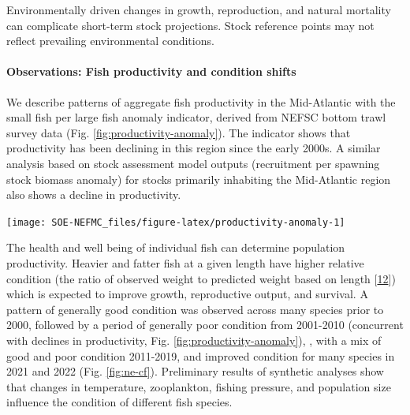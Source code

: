 \documentclass[
  10pt,
]{article}
\let\origfigure\figure
\let\endorigfigure\endfigure
\renewenvironment{figure}[1][2] {
    \expandafter\origfigure\expandafter[H]
} {
    \endorigfigure
}
\begin{document}
Environmentally driven changes in growth, reproduction, and natural mortality can complicate short-term stock projections. Stock reference points may not reflect prevailing environmental conditions.

\hypertarget{observations-fish-productivity-and-condition-shifts}{%
\paragraph{Observations: Fish productivity and condition shifts}\label{observations-fish-productivity-and-condition-shifts}}

We describe patterns of aggregate fish productivity in the Mid-Atlantic with the small fish per large fish anomaly indicator, derived from NEFSC bottom trawl survey data (Fig. \ref{fig:productivity-anomaly}). The indicator shows that productivity has been declining in this region since the early 2000s. A similar analysis based on stock assessment model outputs (recruitment per spawning stock biomass anomaly) for stocks primarily inhabiting the Mid-Atlantic region also shows a decline in productivity.

\begin{figure}

{\centering \texttt{[image: SOE-NEFMC\_files/figure-latex/productivity-anomaly-1]} 

}

\caption{Fish productivity measures. Left: Small fish per large fish survey biomass anomaly in the Mid-Atlantic Bight. Right: assessment recruitment per spawning stock biomass anomaly for stocks mainly in the Mid-Atlantic. The summed anomaly across species is shown by the black line, drawn across all years with the same number of stocks analyzed.}\label{fig:productivity-anomaly}
\end{figure}

The health and well being of individual fish can determine population productivity. Heavier and fatter fish at a given length have higher relative condition (the ratio of observed weight to predicted weight based on length {[}\protect\hyperlink{ref-le_cren_length-weight_1951}{12}{]}) which is expected to improve growth, reproductive output, and survival. A pattern of generally good condition was observed across many species prior to 2000, followed by a period of generally poor condition from 2001-2010 (concurrent with declines in productivity, Fig. \ref{fig:productivity-anomaly}), , with a mix of good and poor condition 2011-2019, and improved condition for many species in 2021 and 2022 (Fig. \ref{fig:ne-cf}). Preliminary results of synthetic analyses show that changes in temperature, zooplankton, fishing pressure, and population size influence the condition of different fish species.
\end{document}
